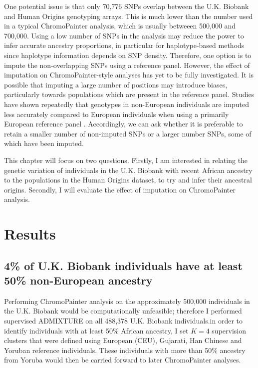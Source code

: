 One potential issue is that only 70,776 SNPs overlap between the U.K. Biobank and Human Origins genotyping arrays. This is much lower than the number used in a typical ChromoPainter analysis, which is usually betweeen 500,000 and 700,000. Using a low number of SNPs in the analysis may reduce the power to infer accurate ancestry proportions, in particular for haplotype-based methods since haplotype information depends on SNP density. Therefore, one option is to impute the non-overlapping SNPs using a reference panel. However, the effect of imputation on ChromoPainter-style analyses has yet to be fully investigated. It is possible that imputing a large number of positions may introduce biases, particularly towards populations which are present in the reference panel. Studies have shown repeatedly that genotypes in non-European individuals are imputed less accurately compared to European individuals when using a primarily European reference panel \cite{delaneau2018integrative, taliun2021sequencing}. Accordingly, we can ask whether it is preferable to retain a smaller number of non-imputed SNPs or a larger number SNPs, some of which have been imputed. 

This chapter will focus on two questions. Firstly, I am interested in relating the genetic variation of individuals in the U.K. Biobank with recent African ancestry to the populations in the Human Origins dataset, to try and infer their ancestral origins. Secondly, I will evaluate the effect of imputation on ChromoPainter analysis. 

\section{Results}

\subsection{4\% of U.K. Biobank individuals have at least 50\% non-European ancestry}

Performing ChromoPainter analysis on the approximately 500,000 individuals in the U.K. Biobank would be computationally unfeasible; therefore I performed supervised ADMIXTURE on all 488,378 U.K. Biobank individuals.in order to identify individuals with at least 50\% African ancestry, I set $K=4$ supervision clusters that were defined using European (CEU), Gujarati, Han Chinese and Yoruban reference individuals. These individuals with more than 50\% ancestry from Yoruba would then be carried forward to later ChromoPainter analyses. 

